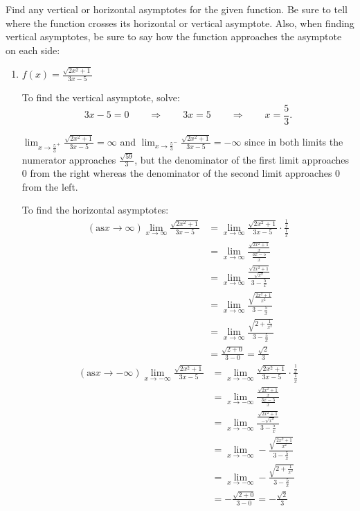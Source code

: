 \documentclass[handout,nooutcomes]{ximera}
\begin{document}
	
\begin{problem}

Find any vertical or horizontal asymptotes for the given function.  Be sure to tell where the function crosses its horizontal or vertical asymptote.  Also, when finding vertical asymptotes, be sure to say how the function approaches the asymptote on each side:

	\begin{enumerate}
	
	\item  $f(x) = \frac{\sqrt{2x^2 + 1}}{3x-5}$
		
		\begin{freeResponse}
		To find the vertical asymptote, solve:
		$$3x-5=0 \qquad \Longrightarrow \qquad 3x = 5 \qquad \Longrightarrow \qquad x = \frac{5}{3}.$$
		
		$\lim_{x \to \frac{5}{3}^+} \frac{\sqrt{2x^2 + 1}}{3x-5} = \infty$ and $\lim_{x \to \frac{5}{3}^-} \frac{\sqrt{2x^2 + 1}}{3x-5} = - \infty$ since in both limits the numerator approaches $\frac{\sqrt{59}}{3}$, but the denominator of the first limit approaches $0$ from the right whereas the denominator of the second limit approaches $0$ from the left.
		
		To find the horizontal asymptotes:
		\begin{align*}
		(\text{as} x \to \infty)  \lim_{x \to \infty} \frac{\sqrt{2x^2 + 1}}{3x-5} &= \lim_{x \to \infty} \frac{\sqrt{2x^2 + 1}}{3x-5} \cdot \frac{\frac{1}{x}}{\frac{1}{x}} \\
		&= \lim_{x \to \infty} \frac{\frac{\sqrt{2x^2 + 1}}{x}}{\frac{3x-5}{x}} \\
		&= \lim_{x \to \infty}  \frac{\frac{\sqrt{2x^2 + 1}}{\sqrt{x^2}}}{3 - \frac{5}{x}} \\
		&= \lim_{x \to \infty}  \frac{\sqrt{\frac{2x^2 + 1}{x^2}}}{3 - \frac{5}{x}} \\
		&= \lim_{x \to \infty}  \frac{\sqrt{2 + \frac{1}{x^2}}}{3 - \frac{5}{x}} \\
		&= \frac{\sqrt{2+0}}{3-0} = \frac{\sqrt{2}}{3} 
		\end{align*}
		\begin{align*}
		(\text{as} x \to -\infty)  \lim_{x \to -\infty} \frac{\sqrt{2x^2 + 1}}{3x-5} &= \lim_{x \to -\infty} \frac{\sqrt{2x^2 + 1}}{3x-5} \cdot \frac{\frac{1}{x}}{\frac{1}{x}} \\
		&= \lim_{x \to -\infty} \frac{\frac{\sqrt{2x^2 + 1}}{x}}{\frac{3x-5}{x}} \\
		&= \lim_{x \to -\infty}  \frac{\frac{\sqrt{2x^2 + 1}}{-\sqrt{x^2}}}{3 - \frac{5}{x}} \\
		&= \lim_{x \to -\infty}  -\frac{\sqrt{\frac{2x^2 + 1}{x^2}}}{3 - \frac{5}{x}} \\
		&= \lim_{x \to -\infty}  -\frac{\sqrt{2 + \frac{1}{x^2}}}{3 - \frac{5}{x}} \\
		&= -\frac{\sqrt{2+0}}{3-0} = -\frac{\sqrt{2}}{3} 
		\end{align*}
		

\end{freeResponse}
\end{enumerate}
\end{problem}
\end{document}

